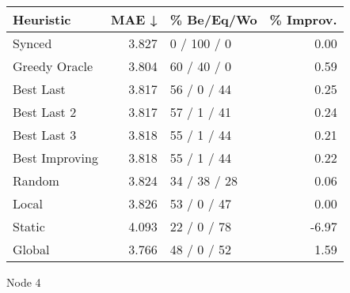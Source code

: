 \begin{tabular}{lrlr}
\toprule
\textbf{Heuristic} & \textbf{MAE ↓} & \textbf{\% Be/Eq/Wo} & \textbf{\% Improv.} \\
\midrule
            Synced &          3.827 &          0 / 100 / 0 &                0.00 \\
     Greedy Oracle &          3.804 &          60 / 40 / 0 &                0.59 \\
         Best Last &          3.817 &          56 / 0 / 44 &                0.25 \\
       Best Last 2 &          3.817 &          57 / 1 / 41 &                0.24 \\
       Best Last 3 &          3.818 &          55 / 1 / 44 &                0.21 \\
    Best Improving &          3.818 &          55 / 1 / 44 &                0.22 \\
            Random &          3.824 &         34 / 38 / 28 &                0.06 \\
             Local &          3.826 &          53 / 0 / 47 &                0.00 \\
            Static &          4.093 &          22 / 0 / 78 &               -6.97 \\
            Global &          3.766 &          48 / 0 / 52 &                1.59 \\
\bottomrule
\end{tabular}
\caption{Node 4}
\label{tab:ds_non_lr01_le1_bs2_4}
